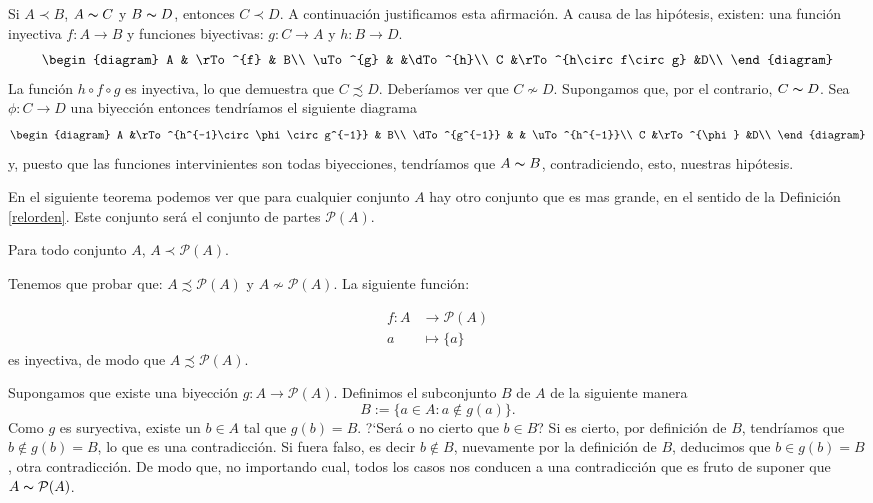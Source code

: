 \begin{ejemplo} Si $A\prec B$, $A\thicksim C$ y
$B\thicksim D$, entonces $C\prec D$. A continuación justificamos esta afirmación. A causa de las
hipótesis, existen: una función inyectiva $f:A\longrightarrow
B$ y funciones biyectivas: $g:C\longrightarrow A$ y
$h:B\longrightarrow D$.
\[
    \begin{diagram}
      A         & \rTo^{f}                  & B\\
       \uTo^{g} &                            &\dTo^{h}\\
       C        &\rTo^{h\circ f\circ g}                    &D\\
       \end{diagram}
       \]
La función $h\circ f \circ g$ es inyectiva, lo que demuestra que
$C\precsim D$. Deberíamos ver que $C\nsim D$. Supongamos que,
por el contrario, $C\thicksim D$. Sea $\phi:C\longrightarrow D$
una biyección entonces tendríamos el siguiente diagrama
\[
    \begin{diagram}
      A             &\rTo^{h^{-1}\circ\phi\circ g^{-1}}     & B\\
      \dTo^{g^{-1}} &                                       & \uTo^{h^{-1}}\\
      C              &\rTo^{\phi}                            &D\\
       \end{diagram}
       \]
y, puesto que las funciones intervinientes son todas biyecciones,
tendríamos que $A\thicksim B$, contradiciendo, esto, nuestras
hipótesis.
\end{ejemplo}

En el siguiente teorema podemos ver que para cualquier conjunto
$A$ hay otro conjunto que es mas grande, en el sentido de la
Definición \vref{relorden}. Este conjunto será el conjunto de
partes $\mathcal{P}(A)$.

\begin{teorema}[Cantor]\label{teorcantor} Para todo conjunto $A$, $A\prec\mathcal{P}(A)$.
\end{teorema}
\begin{demo} Tenemos que probar que: $A\precsim\mathcal{P}(A)$ y
$A\nsim\mathcal{P}(A)$. La siguiente función:

\[\begin{split}
        f:A&\longrightarrow\mathcal{P}(A)\\
          a&\longmapsto \{a\}
  \end{split}
\]
es inyectiva, de modo que $A\precsim\mathcal{P}(A)$.

Supongamos que existe una biyección
$g:A\longrightarrow\mathcal{P}(A)$. Definimos el subconjunto $B$
de $A$ de la siguiente manera
\[B:=\{a\in A:a\notin g(a)\}.\]
Como $g$ es suryectiva, existe un $b\in A$ tal que $g(b)=B$.
?`Será o no cierto que $b\in B$? Si es cierto, por definición
de $B$, tendríamos que $b\notin g(b)=B$, lo que es una
contradicción. Si fuera falso, es decir $b\notin B$, nuevamente
por la definición de $B$, deducimos que $b\in g(b)=B$, otra
contradicción. De modo que, no importando cual, todos los casos
nos conducen a una contradicción que es  fruto de suponer que
$A\thicksim\mathcal{P}(A)$.
\end{demo}

